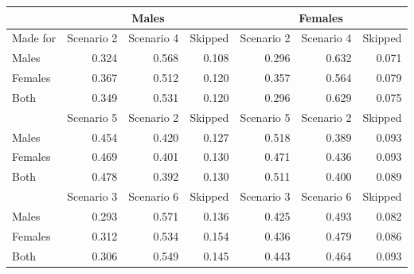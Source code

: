 \begin{tabular}{lrrrrrr} 
\hline \hline 
 & \multicolumn{3}{c}{Males} & \multicolumn{3}{c}{Females} \\
\hline
Made for & Scenario 2 & Scenario 4 & Skipped & Scenario 2 & Scenario 4 & Skipped \\
 Males &   0.324 &   0.568 &   0.108 &   0.296 &   0.632 &   0.071 \\ 
 Females &   0.367 &   0.512 &   0.120 &   0.357 &   0.564 &   0.079 \\ 
 Both &   0.349 &   0.531 &   0.120 &   0.296 &   0.629 &   0.075 \\ 
 & Scenario 5 & Scenario 2 & Skipped & Scenario 5 & Scenario 2 & Skipped \\
 Males &   0.454 &   0.420 &   0.127 &   0.518 &   0.389 &   0.093 \\ 
 Females &   0.469 &   0.401 &   0.130 &   0.471 &   0.436 &   0.093 \\ 
 Both &   0.478 &   0.392 &   0.130 &   0.511 &   0.400 &   0.089 \\ 
 & Scenario 3 & Scenario 6 & Skipped & Scenario 3 & Scenario 6 & Skipped \\
 Males &   0.293 &   0.571 &   0.136 &   0.425 &   0.493 &   0.082 \\ 
 Females &   0.312 &   0.534 &   0.154 &   0.436 &   0.479 &   0.086 \\ 
 Both &   0.306 &   0.549 &   0.145 &   0.443 &   0.464 &   0.093 \\ 
\hline \hline 
\end{tabular}
